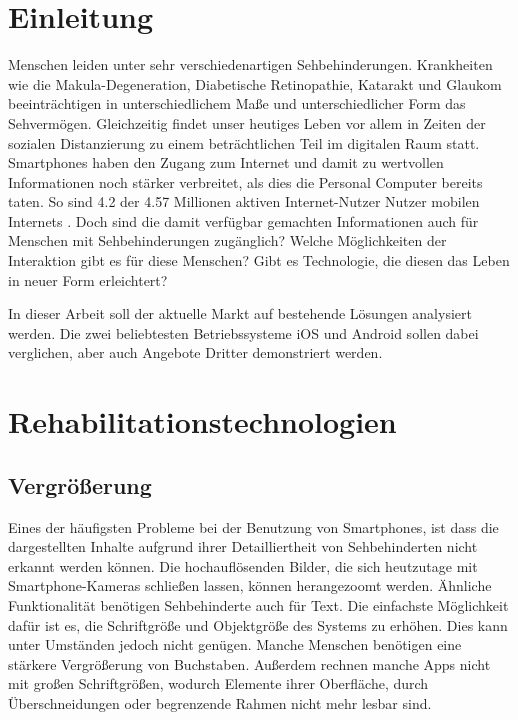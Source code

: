 
\section{Einleitung}

Menschen leiden unter sehr verschiedenartigen Sehbehinderungen. Krankheiten wie die Makula-Degeneration, Diabetische Retinopathie, Katarakt und Glaukom beeinträchtigen in unterschiedlichem Maße und unterschiedlicher Form das Sehvermögen. Gleichzeitig findet unser heutiges Leben vor allem in Zeiten der sozialen Distanzierung zu einem beträchtlichen Teil im digitalen Raum statt. Smartphones haben den Zugang zum Internet und damit zu wertvollen Informationen noch stärker verbreitet, als dies
die Personal Computer bereits taten. So sind 4.2 der 4.57 Millionen aktiven Internet-Nutzer Nutzer mobilen Internets \cite{statista-internet}. Doch sind die damit verfügbar gemachten Informationen auch für Menschen mit Sehbehinderungen zugänglich? Welche Möglichkeiten der Interaktion gibt es für diese Menschen? Gibt es Technologie, die diesen das Leben in neuer Form erleichtert?

In dieser Arbeit soll der aktuelle Markt auf bestehende Lösungen analysiert werden. Die zwei beliebtesten Betriebssysteme iOS und Android sollen dabei verglichen, aber auch Angebote Dritter demonstriert werden.

\section{Rehabilitationstechnologien}

\subsection{Vergrößerung}

Eines der häufigsten Probleme bei der Benutzung von Smartphones, ist dass die dargestellten Inhalte aufgrund ihrer Detailliertheit von Sehbehinderten nicht erkannt werden können. Die hochauflösenden Bilder, die sich heutzutage mit Smartphone-Kameras schließen lassen, können herangezoomt werden. Ähnliche Funktionalität benötigen Sehbehinderte auch für Text. Die einfachste Möglichkeit dafür ist es, die Schriftgröße und Objektgröße des Systems zu erhöhen. Dies kann unter Umständen jedoch nicht genügen. Manche Menschen benötigen eine stärkere Vergrößerung von Buchstaben.
Außerdem rechnen manche Apps nicht mit großen Schriftgrößen, wodurch Elemente ihrer Oberfläche, durch Überschneidungen oder begrenzende Rahmen nicht mehr lesbar sind.

